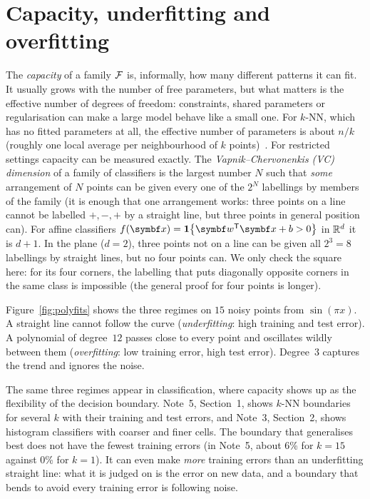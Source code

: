 \documentclass[11pt]{article}
\begin{document}
\section{Capacity, underfitting and overfitting}\label{sec:capacity}

The \emph{capacity} of a family $\mathcal{F}$ is, informally, how many different patterns it can fit. It usually grows with the
number of free parameters, but what matters is the effective number of degrees of freedom: constraints, shared
parameters or regularisation can make a large model behave like a small one. For $k$-NN, which has no fitted
parameters at all, the effective number of parameters is about $n/k$ (roughly one local average per neighbourhood of
$k$ points)~\cite{hastie2009}. For restricted settings capacity can be measured exactly. The
\emph{Vapnik--Chervonenkis (VC) dimension} of a family of classifiers is the largest number $N$ such that \emph{some}
arrangement of $N$ points can be given every one of the $2^N$ labellings by members of the family (it is enough that
one arrangement works: three points on a line cannot be labelled $+,-,+$ by a straight line, but three points in general
position can). For affine classifiers $f(\x) = \ind{\vect{w}\T\x + b > 0}$ in $\mathbb{R}^d$ it is $d + 1$. In the plane
($d = 2$), three points not on a line can be given all $2^3 = 8$ labellings by straight lines, but no four points can.
We only check the square here: for its four corners, the labelling that puts diagonally opposite corners in the same
class is impossible (the general proof for four points is longer).

Figure~\ref{fig:polyfits} shows the three regimes on $15$ noisy points from $\sin(\pi x)$. A straight line cannot follow
the curve (\emph{underfitting}: high training and test error). A polynomial of degree~$12$ passes close to every point and
oscillates wildly between them (\emph{overfitting}: low training error, high test error). Degree~$3$ captures the trend
and ignores the noise.

The same three regimes appear in classification, where capacity shows up as the flexibility of the decision boundary.
Note~5, Section~1, shows $k$-NN boundaries for several $k$ with their training and test errors, and Note~3, Section~2,
shows histogram classifiers with coarser and finer cells. The boundary that generalises best does not have the
fewest training errors (in Note~5, about 6\% for $k = 15$ against 0\% for $k = 1$). It can even make \emph{more}
training errors than an underfitting straight line: what it is judged on is the error on new data, and a boundary that
bends to avoid every training error is following noise.
\end{document}
